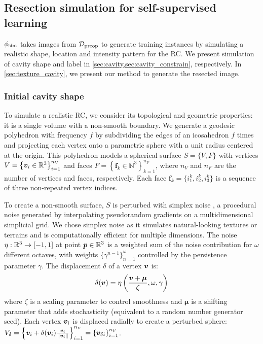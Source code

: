 \subsection{Resection simulation for self-supervised learning}
\label{sec:simulation}

\newcommand{\AAA}{\bm{A}}
\newcommand{\NN}{\mathcal{N}}


$\phi_{\textnormal{sim}}$ takes images from $\mathcal{D}_{\textnormal{preop}}$ to generate training instances by simulating a realistic shape, location and intensity pattern for the \ac{RC}.
We present simulation of cavity shape and label in \cref{sec:cavity,sec:cavity_constrain}, respectively.
In \cref{sec:texture_cavity}, we present our method to generate the resected image.


\subsubsection{Initial cavity shape}
\label{sec:cavity}

To simulate a realistic \ac{RC}, we consider its topological and geometric properties: it is a single volume with a non-smooth boundary.
We generate a geodesic polyhedron with frequency $f$ by subdividing the edges of an icosahedron $f$ times and projecting each vertex onto a parametric sphere with a unit radius centered at the origin.
This polyhedron models a spherical surface $S = \{ V, F \}$ with vertices
$
  V = \left\{
    \bm{v}_i \in \mathbb{R}^3
  \right\}
  _{i = 1}^{n_V}
$
and faces
$
  F = \left\{
    \bm{f}_k \in \mathbb{N}^3
  \right\}
  _{k = 1}^{n_F}
$, where $n_V$ and $n_F$ are the number of vertices and faces, respectively.
%
Each face $\bm{f}_k = \{ i_1^k, i_2^k, i_3^k \}$ is a sequence of three non-repeated vertex indices.

To create a non-smooth surface, $S$ is perturbed with simplex noise \cite{perlin_improving_2002}, a procedural noise generated by interpolating pseudorandom gradients on a multidimensional simplicial grid.
We chose simplex noise as it simulates natural-looking textures or terrains and is computationally efficient for multiple dimensions.
The noise $\eta : \mathbb{R}^3 \to [-1, 1]$ at point $\bm{p} \in \mathbb{R}^3$ is a weighted sum of the noise contribution for $\omega$ different octaves, with weights $\{\gamma ^ {n - 1}\}_{n = 1}^{\omega}$ controlled by the persistence parameter $\gamma$.
The displacement $\delta$ of a vertex $\bm{v}$ is:
\begin{equation}
  \delta(\bm{v})
  = \eta \left( \frac{\bm{v} + \bm{\mu} }{\zeta}, \omega, \gamma \right)
\end{equation}
where
$\zeta$ is a scaling parameter to control smoothness
and $\bm{\mu}$ is a shifting parameter that adds stochasticity
(equivalent to a random number generator seed).
%
Each vertex $\bm{v}_i$ is displaced radially to create a perturbed sphere:
$
V_{\delta}
  = \left\{
  \bm{v}_i
  + \delta(\bm{v}_i)
  \frac{\bm{v}_i}{\|\bm{v}_i\|}
  \right\}
  _{i = 1}^{n_V}
  = \left\{
  \bm{v}_{\delta i}
  \right\}
  _{i = 1}^{n_V}
$.

